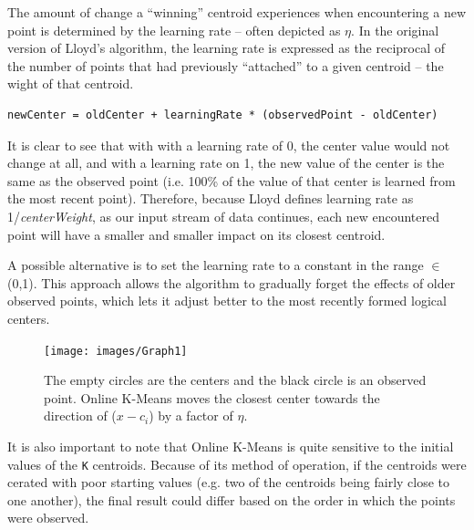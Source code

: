 \documentclass{l4proj}
\begin{document}
The amount of change a ``winning'' centroid experiences when encountering a new point is determined by the learning rate -- often depicted as $\eta$. In the original version of Lloyd's algorithm, the learning rate is expressed as the reciprocal of the number of points that had previously ``attached'' to a given centroid -- the wight of that centroid. 

\begin{center}
\begin{BVerbatim}
newCenter = oldCenter + learningRate * (observedPoint - oldCenter)
\end{BVerbatim}
\end{center}

It is clear to see that with with a learning rate of 0, the center value would not change at all, and with a learning rate on 1, the new value of the center is the same as the observed point (i.e. 100\% of the value of that center is learned from the most recent point). Therefore, because Lloyd defines learning rate as 1/\textit{centerWeight}, as our input stream of data continues, each new encountered point will have a smaller and smaller impact on its closest centroid.

A possible alternative is to set the learning rate to a constant in the range $\in$ (0,1). This approach allows the algorithm to gradually forget the effects of older observed points, which lets it adjust better to the most recently formed logical centers.

\begin{figure}[H]
	\centering
    \label{onlineGraph}
    \texttt{[image: images/Graph1]}
    \caption{The empty circles are the centers and the black circle is an observed point. Online K-Means moves the closest center towards the direction of ($x-c_i$) by a factor of $\eta$.} 
\end{figure}

It is also important to note that Online K-Means is quite sensitive to the initial values of the \texttt{K} centroids. Because of its method of operation, if the centroids were cerated with poor starting values (e.g. two of the centroids being fairly close to one another), the final result could differ based on the order in which the points were observed.
\end{document}
